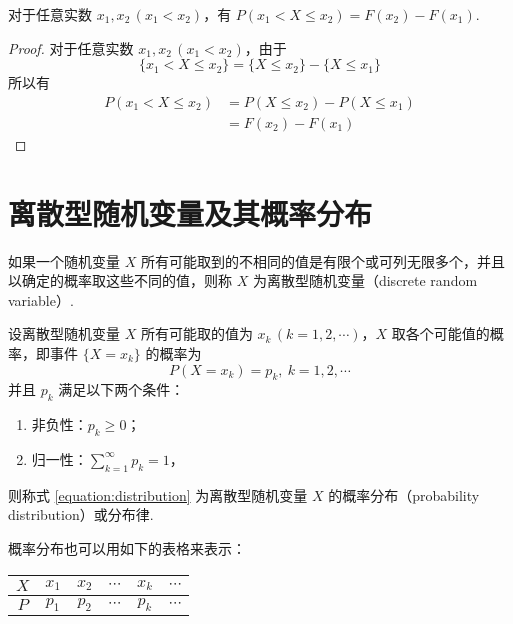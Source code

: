\begin{property}
    \indent 对于任意实数 $x_1,x_2\, (x_1<x_2)$，有 $P(x_1 < X \leqslant x_2)=F(x_2)-F(x_1)$.
\end{property}

\begin{proof}
    对于任意实数 $x_1,x_2\, (x_1<x_2)$，由于
    $$
    \{x_1 < X \leqslant x_2\} = \{X \leqslant x_2\} - \{X \leqslant x_1\}
    $$
    所以有
    $$
    \begin{aligned}
        P(x_1 < X \leqslant x_2) &= P(X \leqslant x_2) - P(X \leqslant x_1) \\
        &= F(x_2)-F(x_1)
    \end{aligned}
    $$

    \vspace{-1.5em}
\end{proof}

\section{离散型随机变量及其概率分布}

\begin{definition}
    \indent 如果一个随机变量 $X$ 所有可能取到的不相同的值是有限个或可列无限多个，并且以确定的概率取这些不同的值，则称 $X$ 为{\heiti 离散型随机变量}（discrete random variable）.
\end{definition}

\begin{definition}
    \indent 设离散型随机变量 $X$ 所有可能取的值为 $x_k\, (k=1,2,\cdots)$，$X$ 取各个可能值的概率，即事件 $\{X=x_k\}$ 的概率为
    \begin{equation} \label{equation:distribution}
        P(X=x_k) = p_k, \ k=1,2,\cdots
    \end{equation}
    并且 $p_k$ 满足以下两个条件：
    \begin{enumerate}
        \item 非负性：$p_k \geqslant 0$；\vspace{0.5em}
        \item 归一性：$\displaystyle\sum_{k=1}^\infty p_k = 1$，
    \end{enumerate} \vspace{0.5em}
    则称式 \eqref{equation:distribution} 为离散型随机变量 $X$ 的{\heiti 概率分布}（probability distribution）或{\heiti 分布律}.
\end{definition}

概率分布也可以用如下的表格来表示：
\begin{table*}[htbp]
    \centering

    \begin{tabular}{c | c c c c c}
        \hline
        $X$ & $x_1$ & $x_2$ & $\cdots$ & $x_k$ & $\cdots$ \\
        \hline
        $P$ & $p_1$ & $p_2$ & $\cdots$ & $p_k$ & $\cdots$ \\
        \hline
    \end{tabular}
\end{table*}

